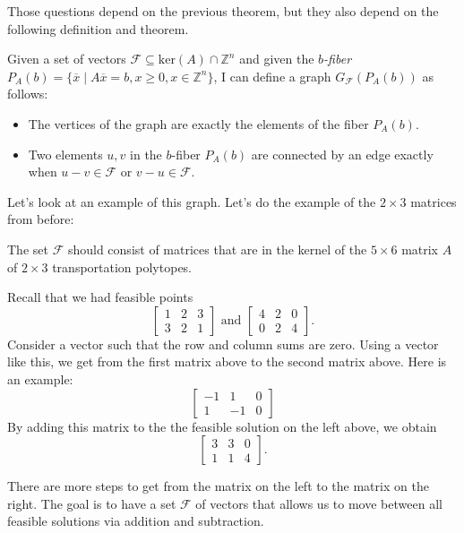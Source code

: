 Those questions depend on the previous theorem, but they also depend on the following definition and theorem.
\begin{definition}{}{}
Given a set of vectors $\mathcal{F} \subseteq \text{ker}(A) \cap \mathbb{Z}^n$ and given
 the \textit{$b$-fiber} $P_A(b) = \{\overline{x} \mid A\overline{x} = b, x \geq 0, x \in \mathbb{Z}^n\}$,
  I can define a graph $G_{\mathcal{F}}(P_A(b))$ as follows:
\begin{itemize}
\item The vertices of the graph are exactly the elements of the fiber $P_A(b)$.
\item Two elements $u, v$ in the $b$-fiber $P_A(b)$ are connected by an edge exactly when $u-v \in \mathcal{F}$ or $v-u \in \mathcal{F}$.
\end{itemize}
\end{definition}
Let's look at an example of this graph. Let's do the example of the $2 \times 3$ matrices from before:
\begin{example}
The set $\mathcal{F}$ should consist of matrices that are in the kernel of the $5 \times 6$ matrix $A$ of $2 \times 3$ transportation polytopes.

Recall that we had feasible points
\[
\left[
\begin{array}{ccc}
1&2&3 \\ 3 & 2&1
\end{array}
\right]
\text{ and }
\left[
\begin{array}{ccc}
4&2&0\\0&2&4
\end{array}
\right]
.\]
Consider a vector such that the row and column sums are zero.  Using a vector like this, we  get from the first matrix above to the second matrix above. Here is an example:
\[ \left[
\begin{array}{ccc}
-1&1&0\\1&-1&0
\end{array}
\right]
\]
By adding this matrix to the the feasible solution on the left above, we obtain
\[
\left[
\begin{array}{ccc}
3&3&0\\1&1&4
\end{array}
\right]
.\]

There are  more steps to get from the matrix on the left to the matrix on the right. The goal is to have a set $\mathcal{F}$ of vectors that allows us to move between all feasible solutions via addition and subtraction.
\end{example}

